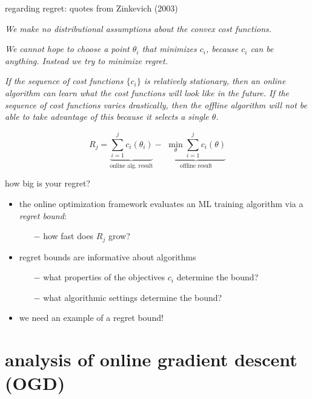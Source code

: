 \documentclass[xcolor={svgnames},
               hyperref={colorlinks,citecolor=DeepPink4,linkcolor=FireBrick,urlcolor=Maroon}]
               {beamer}
\begin{document}
\begin{frame}{regarding regret: quotes from Zinkevich (2003)}

\emph{We make \alert{no distributional assumptions} about the convex cost functions.}

\medskip
\noindent \emph{We cannot hope to choose a point $\theta_i$ that minimizes $c_i$, because $c_i$ can be anything. Instead we try to \alert{minimize regret}.}

\medskip
\noindent \emph{If the sequence of cost functions $\{c_i\}$ is relatively stationary, then an online algorithm can learn what the cost functions will look like in the future.  If the sequence of cost functions varies drastically, then the offline algorithm will not be able to take advantage of this because it selects a single $\theta$.}

  $$R_j = \underbrace{\sum_{i=1}^j c_i(\theta_i)}_{\text{online alg.~result}} - \,\, \underbrace{\min_\theta \sum_{i=1}^j c_i(\theta)}_{\text{offline result}}$$
\end{frame}


\begin{frame}{how big is your regret?}

\begin{itemize}
\item the online optimization framework evaluates an ML training algorithm via a \emph{regret bound}:
    \begin{itemize}
    \item[$-$] how fast does $R_j$ grow?
    \end{itemize}
\item regret bounds are informative about algorithms
    \begin{itemize}
    \item[$-$] what properties of the objectives $c_i$ determine the bound?
    \item[$-$] what algorithmic settings determine the bound?
    \end{itemize}
\item we need an example of a regret bound!
\end{itemize}
\end{frame}


\section{analysis of online gradient descent (OGD)}
\end{document}
